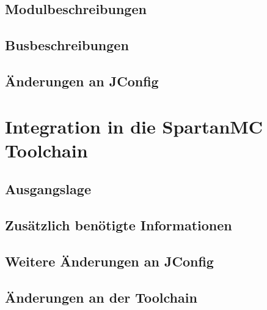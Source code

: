 \subsection{Modulbeschreibungen}

\subsection{Busbeschreibungen}

\subsection{Änderungen an JConfig}

\section{Integration in die SpartanMC Toolchain}
\subsection{Ausgangslage}

\subsection{Zusätzlich benötigte Informationen}

\subsection{Weitere Änderungen an JConfig}

\subsection{Änderungen an der Toolchain}

